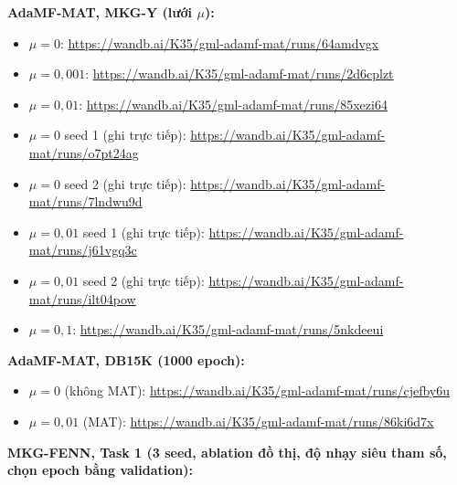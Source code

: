 \par\smallskip\noindent\textbf{AdaMF-MAT, MKG-Y (lưới $\mu$):}
\begin{itemize}\itemsep0pt\parskip0pt
  \item $\mu{=}0$: \url{https://wandb.ai/K35/gml-adamf-mat/runs/64amdvgx}
  \item $\mu{=}0{,}001$: \url{https://wandb.ai/K35/gml-adamf-mat/runs/2d6cplzt}
  \item $\mu{=}0{,}01$: \url{https://wandb.ai/K35/gml-adamf-mat/runs/85xezi64}
  \item $\mu{=}0$ seed 1 (ghi trực tiếp): \url{https://wandb.ai/K35/gml-adamf-mat/runs/o7pt24ag}
  \item $\mu{=}0$ seed 2 (ghi trực tiếp): \url{https://wandb.ai/K35/gml-adamf-mat/runs/7lndwu9d}
  \item $\mu{=}0{,}01$ seed 1 (ghi trực tiếp): \url{https://wandb.ai/K35/gml-adamf-mat/runs/j61vgq3c}
  \item $\mu{=}0{,}01$ seed 2 (ghi trực tiếp): \url{https://wandb.ai/K35/gml-adamf-mat/runs/ilt04pow}
  \item $\mu{=}0{,}1$: \url{https://wandb.ai/K35/gml-adamf-mat/runs/5nkdeeui}
\end{itemize}
\par\smallskip\noindent\textbf{AdaMF-MAT, DB15K (1000 epoch):}
\begin{itemize}\itemsep0pt\parskip0pt
  \item $\mu{=}0$ (không MAT): \url{https://wandb.ai/K35/gml-adamf-mat/runs/cjefby6u}
  \item $\mu{=}0{,}01$ (MAT): \url{https://wandb.ai/K35/gml-adamf-mat/runs/86ki6d7x}
\end{itemize}
\par\smallskip\noindent\textbf{MKG-FENN, Task 1 (3 seed, ablation đồ thị, độ nhạy siêu tham số, chọn epoch bằng validation):}
